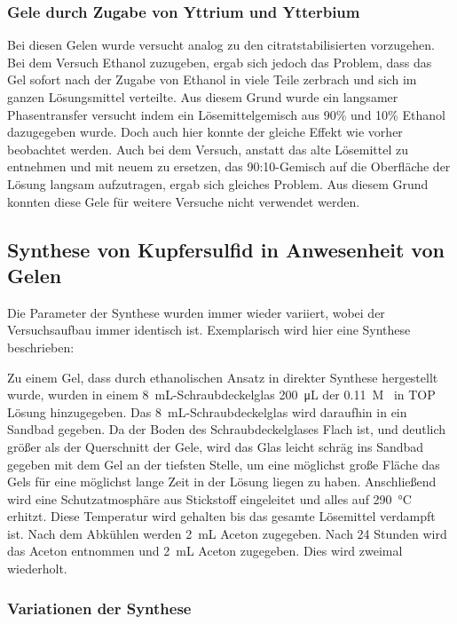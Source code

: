 			\subsubsection{Gele durch Zugabe von Yttrium und Ytterbium}
				Bei diesen Gelen wurde versucht analog zu den citratstabilisierten vorzugehen.
				Bei dem Versuch Ethanol zuzugeben, ergab sich jedoch das Problem, dass das Gel sofort nach der Zugabe von Ethanol in viele Teile zerbrach und sich im ganzen Lösungsmittel verteilte.
				Aus diesem Grund wurde ein langsamer Phasentransfer versucht indem ein Lösemittelgemisch aus 90\%  und 10\% Ethanol dazugegeben wurde.
				Doch auch hier konnte der gleiche Effekt wie vorher beobachtet werden.
				Auch bei dem Versuch, anstatt das alte Lösemittel zu entnehmen und mit neuem zu ersetzen, das 90:10-Gemisch auf die Oberfläche der Lösung langsam aufzutragen, ergab sich gleiches Problem.
				Aus diesem Grund konnten diese Gele für weitere Versuche nicht verwendet werden.   
	
	\subsection{Synthese von Kupfersulfid in Anwesenheit von Gelen}
		
			Die Parameter der Synthese wurden immer wieder variiert, wobei der Versuchsaufbau immer identisch ist.
			Exemplarisch wird hier eine Synthese beschrieben:
			
			Zu einem Gel, dass durch ethanolischen Ansatz in direkter Synthese hergestellt wurde,  wurden in einem \SI{8}{\milli\liter}-Schraubdeckelglas \SI{200}{\micro\liter} der 0.11~M~ in TOP Lösung hinzugegeben.
			Das \SI{8}{\milli\liter}-Schraubdeckelglas wird daraufhin in ein Sandbad gegeben.
			Da der Boden des Schraubdeckelglases Flach ist, und deutlich größer als der Querschnitt der Gele, wird das Glas leicht schräg ins Sandbad gegeben mit dem Gel an der tiefsten Stelle, um eine möglichst große Fläche das Gels für eine möglichst lange Zeit in der Lösung liegen zu haben.
			Anschließend wird eine Schutzatmosphäre aus Stickstoff eingeleitet und alles auf \SI{290}{\degreeCelsius} erhitzt.
			Diese Temperatur wird gehalten bis das gesamte Lösemittel verdampft ist.
			Nach dem Abkühlen werden \SI{2}{\milli\liter} Aceton zugegeben. 
			Nach 24 Stunden wird das Aceton entnommen und \SI{2}{\milli\liter} Aceton zugegeben.
			Dies wird zweimal wiederholt. 
			
			\subsubsection{Variationen der Synthese}
				
